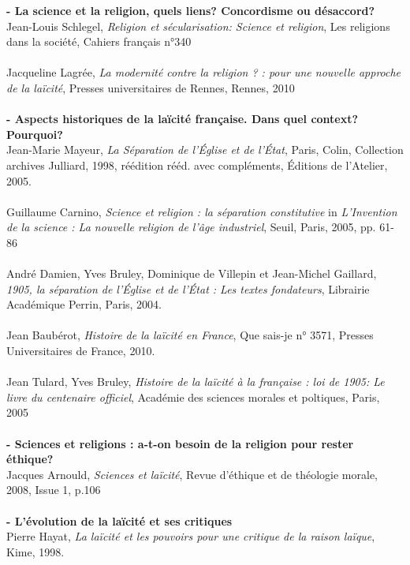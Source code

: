\documentclass{article}
\begin{document}
\begin{thebibliography}{9}

		\textbf{- La science et la religion, quels liens? Concordisme ou désaccord?}\\
		Jean-Louis Schlegel,
		\emph{Religion et s\'ecularisation: Science et religion},
		Les religions dans la soci\'et\'e,
		Cahiers français n°340
		\\\\
		Jacqueline Lagrée, \emph{La modernité contre la religion ? : pour une nouvelle approche de la laïcité}, Presses universitaires de Rennes, Rennes, 2010
		\\\\
		\textbf{- Aspects historiques de la laïcité française. Dans quel context? Pourquoi?}\\
		Jean-Marie Mayeur,
		\emph{La Séparation de l'Église et de l'État}, Paris, Colin,
		Collection archives Julliard, 1998, réédition
		rééd. avec compléments, Éditions de l'Atelier, 2005.
		\\\\
		Guillaume Carnino, \emph{Science et religion : la séparation constitutive} in \emph{L'Invention de la science : La nouvelle religion de l'âge industriel}, Seuil, Paris, 2005, pp. 61-86
		\\\\
		André Damien, Yves Bruley, Dominique de Villepin et Jean-Michel Gaillard, \emph{1905, la séparation de l'Église et de l'État : Les textes fondateurs}, Librairie Académique Perrin, Paris, 2004.
		\\\\
		Jean Baubérot, \emph{Histoire de la laïcité en France}, Que sais-je n° 3571, Presses Universitaires de France, 2010.
		\\\\
		Jean Tulard, Yves Bruley, \emph{Histoire de la laïcité à la française : loi de 1905: Le livre du centenaire officiel}, Académie des sciences morales et poltiques, Paris, 2005
		\\\\
		\textbf{- Sciences et religions : a-t-on besoin de la religion pour rester éthique?}\\
		Jacques Arnould,
		\emph{Sciences et laïcité},
		Revue d'éthique et de théologie morale, 2008, Issue 1, p.106
		\\\\
		\textbf{- L'évolution de la laïcité et ses critiques}\\
		Pierre Hayat,  \emph{La laïcité et les pouvoirs pour une critique de la raison laïque}, Kime, 1998.

\end{thebibliography}
\end{document}

